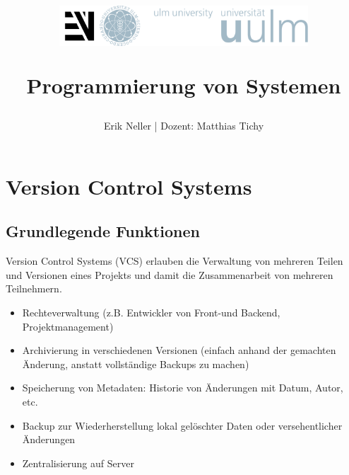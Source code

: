\documentclass[12pt,a4]{article}
\title{
	\begin{figure}
		\centering
		\includegraphics[height=1.5cm]{logo.png}
	\end{figure}
Programmierung von Systemen 
}
\author{Erik Neller | Dozent: Matthias Tichy}
\begin{document}
	
	\maketitle
	\thispagestyle{empty} %
	\newpage
	
	\tableofcontents
	\newpage
	

	
	\section{Version Control Systems}

	\subsection{Grundlegende Funktionen}
		Version Control Systems (VCS) erlauben die Verwaltung von mehreren Teilen und Versionen eines Projekts und damit die Zusammenarbeit von mehreren Teilnehmern.
	\begin{itemize}
		\item Rechteverwaltung (z.B. Entwickler von Front-und Backend, Projektmanagement)
		\item Archivierung in verschiedenen Versionen (einfach anhand der gemachten Änderung, anstatt vollständige Backups zu machen)
		\item Speicherung von Metadaten: Historie von Änderungen mit Datum, Autor, etc.
		\item Backup zur Wiederherstellung lokal gelöschter Daten oder versehentlicher Änderungen
		\item Zentralisierung auf Server
		
	\end{itemize}
\end{document}
